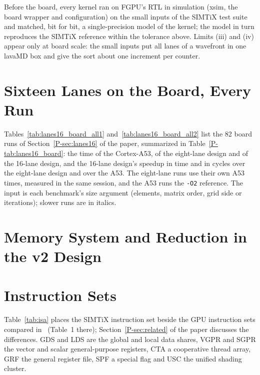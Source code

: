 \documentclass[journal]{IEEEtran}
\begin{document}
Before the board, every kernel ran on FGPU's RTL in simulation (xsim, the board wrapper
and configuration) on the small inputs of the SIMTiX test suite and matched, bit for bit,
a single-precision model of the kernel; the model in turn reproduces the SIMTiX
reference within the tolerance above. Limits (iii) and (iv) appear only at board scale:
the small inputs put all lanes of a wavefront in one lavaMD box and give the sort about
one increment per counter.



\section{Sixteen Lanes on the Board, Every Run}\label{sup:lanes16}
Tables~\ref{tab:lanes16_board_all1} and~\ref{tab:lanes16_board_all2} list the 82
board runs of Section~\ref{P-sec:lanes16} of the paper, summarized in
Table~\ref{P-tab:lanes16_board}: the time of the
Cortex-A53, of the eight-lane design and of the 16-lane design, and the 16-lane design's
speedup in time and in cycles over the eight-lane design and over the A53. The
eight-lane runs use their own A53 times, measured in the same session, and the A53 runs
the \texttt{-O2} reference. The input is each benchmark's size argument (elements,
matrix order, grid side or iterations); slower runs are in italics.



\section{Memory System and Reduction in the v2 Design}\label{sup:evalmem}


\section{Instruction Sets}\label{sup:isa}
Table~\ref{tab:isa} places the SIMTiX instruction set beside the GPU instruction sets
compared in~\cite{vortex} (Table~1 there); Section~\ref{P-sec:related} of the paper
discusses the differences. GDS and LDS are the global and local data shares, VGPR and
SGPR the vector and scalar general-purpose registers, CTA a cooperative thread array,
GRF the general register file, SPF a special flag and USC the unified shading cluster.


\end{document}
